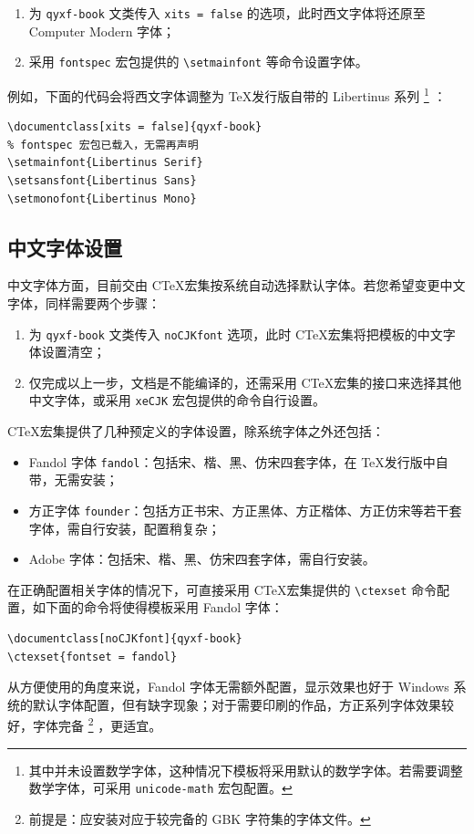 \documentclass[
  10pt,
  twoside,
  openany,
  b5paper, %
  colorscheme = rbb, %
  xits = false,
]{qyxf-book}
\begin{document}
\begin{enumerate}
  \item 为 \verb|qyxf-book| 文类传入 \verb|xits = false| 的选项，此时西文字体将还原至 Computer Modern 字体；
  \item 采用 \verb|fontspec| 宏包提供的 \verb|\setmainfont| 等命令设置字体。
\end{enumerate}

例如，下面的代码会将西文字体调整为 \TeX 发行版自带的 Libertinus 系列
\footnote{其中并未设置数学字体，这种情况下模板将采用默认的数学字体。若需要调整数学字体，可采用 \texttt{unicode-math} 宏包配置。}
：

\begin{tcolorbox}
\begin{verbatim}
\documentclass[xits = false]{qyxf-book}
% fontspec 宏包已载入，无需再声明
\setmainfont{Libertinus Serif}
\setsansfont{Libertinus Sans}
\setmonofont{Libertinus Mono}
\end{verbatim}
\end{tcolorbox}

\subsection{中文字体设置}

中文字体方面，目前交由 C\TeX 宏集按系统自动选择默认字体。若您希望变更中文字体，同样需要两个步骤：
\begin{enumerate}
  \item 为 \verb|qyxf-book| 文类传入 \verb|noCJKfont| 选项，此时 C\TeX 宏集将把模板的中文字体设置清空；
  \item 仅完成以上一步，文档是不能编译的，还需采用 C\TeX 宏集的接口来选择其他中文字体，或采用 \verb|xeCJK| 宏包提供的命令自行设置。
\end{enumerate}

C\TeX 宏集提供了几种预定义的字体设置，除系统字体之外还包括：
\begin{itemize}
  \item Fandol 字体 \verb|fandol|：包括宋、楷、黑、仿宋四套字体，在 \TeX 发行版中自带，无需安装；
  \item 方正字体 \verb|founder|：包括方正书宋、方正黑体、方正楷体、方正仿宋等若干套字体，需自行安装，配置稍复杂；
  \item Adobe 字体：包括宋、楷、黑、仿宋四套字体，需自行安装。
\end{itemize}
在正确配置相关字体的情况下，可直接采用 C\TeX 宏集提供的 \verb|\ctexset| 命令配置，如下面的命令将使得模板采用 Fandol 字体：
\begin{tcolorbox}
\begin{verbatim}
\documentclass[noCJKfont]{qyxf-book}
\ctexset{fontset = fandol}
\end{verbatim}
\end{tcolorbox}
从方便使用的角度来说，Fandol 字体无需额外配置，显示效果也好于 Windows 系统的默认字体配置，但有缺字现象；对于需要印刷的作品，方正系列字体效果较好，字体完备
\footnote{前提是：应安装对应于较完备的 GBK 字符集的字体文件。}
，更适宜。
\end{document}
